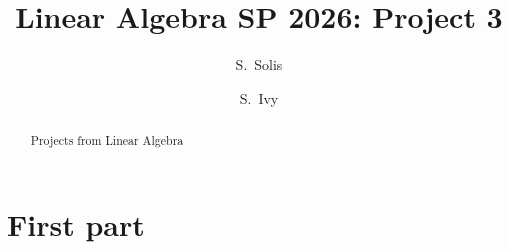 \documentclass{xourse}
\title{Linear Algebra SP 2026: Project 3}
\author{S.\ Solis \and S.\ Ivy}
\begin{document}
\begin{abstract}
    Projects from Linear Algebra
\end{abstract}
\maketitle

\part{First part}

\end{document}
